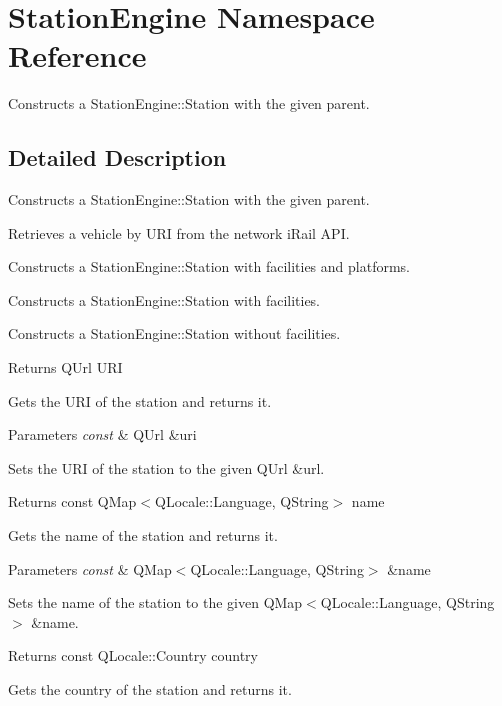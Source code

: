 \hypertarget{namespaceStationEngine}{}\section{Station\+Engine Namespace Reference}
\label{namespaceStationEngine}


Constructs a Station\+Engine\+::\+Station with the given parent.  




\subsection{Detailed Description}
Constructs a Station\+Engine\+::\+Station with the given parent. 

Retrieves a vehicle by U\+RI from the network i\+Rail A\+PI.

Constructs a Station\+Engine\+::\+Station with facilities and platforms.

Constructs a Station\+Engine\+::\+Station with facilities.

Constructs a Station\+Engine\+::\+Station without facilities.

\begin{DoxyReturn}{Returns}
Q\+Url U\+RI
\end{DoxyReturn}
Gets the U\+RI of the station and returns it.


\begin{DoxyParams}{Parameters}
{\em const} & Q\+Url \&uri\\
\hline
\end{DoxyParams}
Sets the U\+RI of the station to the given Q\+Url \&url.

\begin{DoxyReturn}{Returns}
const Q\+Map$<$\+Q\+Locale\+::\+Language, Q\+String$>$ name
\end{DoxyReturn}
Gets the name of the station and returns it.


\begin{DoxyParams}{Parameters}
{\em const} & Q\+Map$<$\+Q\+Locale\+::\+Language, Q\+String$>$ \&name\\
\hline
\end{DoxyParams}
Sets the name of the station to the given Q\+Map$<$\+Q\+Locale\+::\+Language, Q\+String$>$ \&name.

\begin{DoxyReturn}{Returns}
const Q\+Locale\+::\+Country country
\end{DoxyReturn}
Gets the country of the station and returns it.


